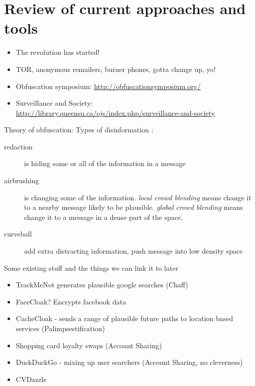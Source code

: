 \documentclass{IOS-Book-Article}     %
\newcommand{\tbox}[3][red]{{
\color{#1}\noindent{
   \fbox{\scriptsize{ {\bf #2} \textsl{#3}}}
   \vspace{2pt}
}
}}
\newcommand{\todo}[1]{\tbox{TODO:}{#1}}
\begin{document}
\section{Review of current approaches and tools} 
\todo{Max to do some writing}

\begin{itemize}
  \item The revolution has started!
  \item TOR, anonymous remailers, burner phones, gotta change up, yo!
  \item Obfuscation symposium: \url{http://obfuscationsymposium.org/}
  \item Surveillance and Society: \url{http://library.queensu.ca/ojs/index.php/surveillance-and-society}
\end{itemize}

Theory of obfuscation:
Types of disinformation \cite{alexander2010Disinformation}:
\begin{description}
  \item[redaction] is hiding some or all of the information in a message
  \item[airbrushing] is changing some of the information. \emph{local crowd
  blending} means change it to a nearby message likely to be plausible.
  \emph{global crowd blending} means change it to a message in a dense part of
  the space.
  \item[curveball] add extra distracting information, push message into low
  density space
\end{description}

Some existing stuff and the things we can link it to later

\begin{itemize}
  \item TrackMeNot generates plausible google searches (Chaff)
  \item FaceCloak? Encrypts facebook data
  \item CacheCloak - sends a range of plausible future paths to location based
  services (Palimpsestification)
  \item Shopping card loyalty swaps (Account Sharing)
  \item DuckDuckGo - mixing up user searchers (Account Sharing, no cleverness)
  \item CVDazzle
\end{itemize}
\end{document}
